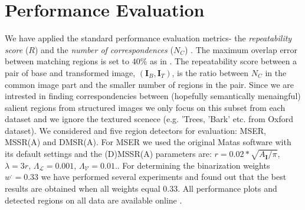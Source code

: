 \documentclass[conference,compsoc]{IEEEtran}
\def\I{{\mathbf I}}
\def\mcL{{\mathcal{L}}}
\def\mcV{{\mathcal{V}}}
\begin{document}
\section{Performance  Evaluation}
\label{sec:perf}


We have applied the standard performance evaluation metrics- the {\em repeatability score} ($R$) and the {\em number of correspondences} ($N_C$) \cite{Mikolajczyk:2005}. The maximum overlap error between matching regions is set to $40\%$ as in \cite{Mikolajczyk:2005}. The repeatability score between a pair of base and transformed image, $(\I_B,\I_T)$, is the ratio between $N_C$ in the common image part and the smaller number of regions in the pair. Since we are intrested in finding correspondencies between (hopefully semantically menaingful) salient regions from structured images we only focus on this subset from each dataset and we ignore the textured scenece (e.g. 'Trees, 'Bark' etc. from Oxford dataset). We considered and five region detectors for evaluation: MSER, MSSR(A) and DMSR(A). For MSER we used the original Matas software with its default settings and the (D)MSSR(A) parameters are: $r = 0.02*\sqrt{A_{\I} / \pi}$, $\lambda=3r$, $\Lambda_{\mcL}=0.001$, $\Lambda_{\mcV}=0.01$..  For determining the binarization weights $w^{\cdot}=0.33$ we have performed several experiments and found out that the best results are obtained when all weights equal $0.33$.
All performance plots and detected regions on all data are available online \cite{elena_ranguelova_2016_45156}.
\end{document}
